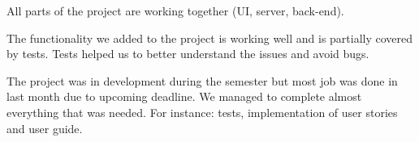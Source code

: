 \documentclass[a4paper, 12pt, final]{hitec}
\begin{document}
  All parts of the project are working together (UI, server, back-end).

  The functionality we added to the project is working well and is partially covered by tests.
  Tests helped us to better understand the issues and avoid bugs.

  The project was in development during the semester but most job was done in last month
  due to upcoming deadline. We managed to complete almost everything that was needed. 
  For instance: tests, implementation of user stories and user guide. 
  \clearpage
\end{document}
